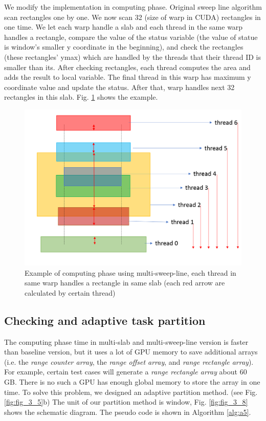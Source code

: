We modify the implementation in computing phase. Original sweep line algorithm scan rectangles one by one. We now scan 32 (size of warp in CUDA) rectangles in one time. We let each warp handle a slab and each thread in the same warp handles a rectangle, compare the value of the status variable (the value of statue is window's smaller y coordinate in the beginning), and check the rectangles (these rectangles' ymax) which are handled by the threads that their thread ID is smaller than its. After checking rectangles, each thread computes the area and adds the result to local variable. The final thread in this warp has maximum y coordinate value and update the status. After that, warp handles next 32 rectangles in this slab. Fig. \ref{fig:fig_4_2} shows the example.
\begin{figure}[h]
    \centering
    \includegraphics[scale=0.4]{image/fig_4_2.png}
    \caption{Example of computing phase using multi-sweep-line, each thread in same warp handles a rectangle in same slab (each red arrow are calculated by certain thread)}
    \label{fig:fig_4_2}
\end{figure}

\subsection{Checking and adaptive task partition}
The computing phase time in multi-slab and multi-sweep-line version is faster than baseline version, but it uses a lot of GPU memory to save additional arrays (i.e. the \textit{range counter array}, the \textit{range offset array}, and \textit{range rectangle array}). For example, certain test cases will generate a \textit{range rectangle array} about 60 GB. There is no such a GPU has enough global memory to store the array in one time. To solve this problem, we designed an adaptive partition method. (see Fig. \ref{fig:fig_3_5}b) The unit of our partition method is window, Fig. \ref{fig:fig_3_8} shows the schematic diagram. The pseudo code is shown in Algorithm \ref{alg:a5}.

